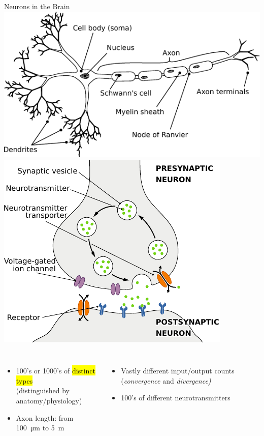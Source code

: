 \documentclass[handout,aspectratio=169]{beamer}
\begin{document}
\begin{frame}{Neurons in the Brain}
	\centering
	\includegraphics[scale=0.85]{media/neuron_sketch.pdf}
	\includegraphics[scale=0.85]{media/synapse_schematic.pdf}
	\begin{columns}[t]
		\begin{itemize}
			\item 100's or 1000's of \hl{distinct types}\\(distinguished by anatomy/physiology)
			\item Axon length: from \SI{100}{\micro\metre} to \SI{5}{\metre}
		\end{itemize}
		\begin{itemize}
			\item Vastly different input/output counts (\emph{convergence} and \emph{divergence)}
			\item 100's of different neurotransmitters
		\end{itemize}
	\end{columns}
\end{frame}
\end{document}

